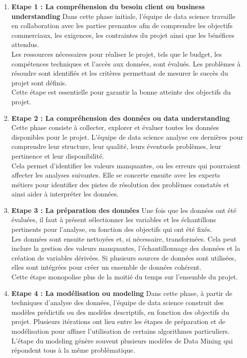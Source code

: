 \documentclass[a4paper,14pt]{article}
\begin{document}
        \begin{enumerate}
            \item \textbf{Etape 1 : La compréhension du besoin client ou business understanding}
            Dans cette phase initiale, l’équipe de data science travaille en collaboration avec les parties prenantes afin de comprendre les objectifs commerciaux, les exigences, les contraintes du projet ainsi que les bénéfices attendus.\\ 
            Les ressources nécessaires pour réaliser le projet, tels que le budget, les compétences techniques et l'accès aux données, sont évalués. Les problèmes à résoudre sont identifiés et les critères permettant de mesurer le succès du projet sont définis. \\
            Cette étape est essentielle pour garantir la bonne atteinte des objectifs du projet.
    
            \item \textbf{Etape 2 : La compréhension des données ou data understanding}
            Cette phase consiste à collecter, explorer et évaluer toutes les données disponibles pour le projet. L'équipe de data science analyse ces dernières pour comprendre leur structure, leur qualité, leurs éventuels problèmes, leur pertinence et leur disponibilité. \\
            Cela permet d’identifier les valeurs manquantes, ou les erreurs qui pourraient affecter les analyses suivantes. Elle se concerte ensuite avec les experts métiers pour identifier des pistes de résolution des problèmes constatés et ainsi aider à interpréter les données.
    
            
            \item \textbf{Etape 3 : La préparation des données}
            Une fois que les données ont été évaluées, il faut à présent sélectionner les variables et les échantillons pertinents pour l’analyse, en fonction des objectifs qui ont été fixés.\\ 
            Les données sont ensuite nettoyées et, si nécessaire, transformées. Cela peut inclure la gestion des valeurs manquantes, l'échantillonnage des données et la création de variables dérivées. Si plusieurs sources de données sont utilisées, elles sont intégrées pour créer un ensemble de données cohérent.\\ 
            Cette étape monopolise plus de la moitié du temps sur l’ensemble du projet.
            
            \item \textbf{Etape 4 : La modélisation ou modeling}
            Dans cette phase, à partir de techniques d'analyse des données, l’équipe de data science construit des modèles prédictifs ou des modèles descriptifs, en fonction des objectifs du projet. Plusieurs itérations ont lieu entre les étapes de préparation et de modélisation pour affiner l’utilisation de certains algorithmes particuliers. \\
            L’étape du modeling génère souvent plusieurs modèles de Data Mining qui répondent tous à la même problématique.
    

\end{enumerate}
\end{document}
